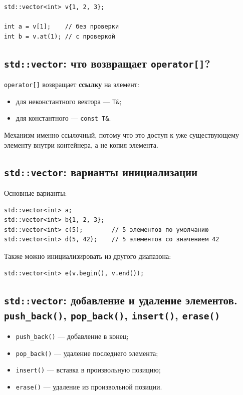 \begin{example}
\begin{verbatim}
std::vector<int> v{1, 2, 3};

int a = v[1];    // без проверки
int b = v.at(1); // с проверкой
\end{verbatim}
\end{example}

\subsection{\texttt{std::vector}: что возвращает \texttt{operator[]}?}
\texttt{operator[]} возвращает \textbf{ссылку} на элемент:
\begin{itemize}
    \item для неконстантного вектора — \texttt{T\&};
    \item для константного — \texttt{const T\&}.
\end{itemize}

\begin{remark}
Механизм именно ссылочный, потому что это доступ к уже существующему элементу внутри контейнера, а не копия элемента.
\end{remark}

\subsection{\texttt{std::vector}: варианты инициализации}
Основные варианты:
\begin{verbatim}
std::vector<int> a;
std::vector<int> b{1, 2, 3};
std::vector<int> c(5);        // 5 элементов по умолчанию
std::vector<int> d(5, 42);    // 5 элементов со значением 42
\end{verbatim}

Также можно инициализировать из другого диапазона:
\begin{verbatim}
std::vector<int> e(v.begin(), v.end());
\end{verbatim}

\subsection{\texttt{std::vector}: добавление и удаление элементов. \texttt{push\_back()}, \texttt{pop\_back()}, \texttt{insert()}, \texttt{erase()}}
\begin{itemize}
    \item \texttt{push\_back()} — добавление в конец;
    \item \texttt{pop\_back()} — удаление последнего элемента;
    \item \texttt{insert()} — вставка в произвольную позицию;
    \item \texttt{erase()} — удаление из произвольной позиции.
\end{itemize}

